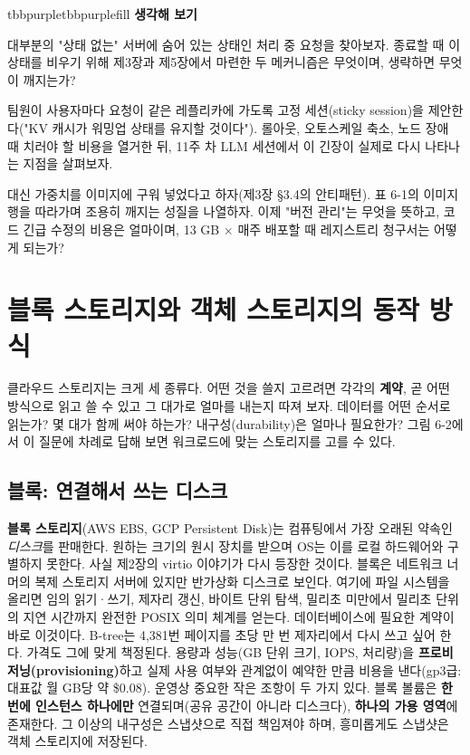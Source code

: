 \begin{calloutbox}{tbbpurple}{tbbpurplefill}
{\normalsize\bfseries\color{tbbpurple}생각해 보기}\par\vspace{3pt}
\begin{tbbitemize}
  \item 대부분의 "상태 없는" 서버에 숨어 있는 상태인 처리 중 요청을 찾아보자. 종료할 때 이 상태를 비우기 위해 제3장과 제5장에서 마련한 두 메커니즘은 무엇이며, 생략하면 무엇이 깨지는가?
  \item 팀원이 사용자마다 요청이 같은 레플리카에 가도록 고정 세션(sticky session)을 제안한다("KV 캐시가 워밍업 상태를 유지할 것이다"). 롤아웃, 오토스케일 축소, 노드 장애 때 치러야 할 비용을 열거한 뒤, 11주 차 LLM 세션에서 이 긴장이 실제로 다시 나타나는 지점을 살펴보자.
  \item 대신 가중치를 이미지에 구워 넣었다고 하자(제3장 §3.4의 안티패턴). 표 6-1의 이미지 행을 따라가며 조용히 깨지는 성질을 나열하자. 이제 "버전 관리"는 무엇을 뜻하고, 코드 긴급 수정의 비용은 얼마이며, 13 GB × 매주 배포할 때 레지스트리 청구서는 어떻게 되는가?
\end{tbbitemize}
\end{calloutbox}

\section{블록 스토리지와 객체 스토리지의 동작 방식}

클라우드 스토리지는 크게 세 종류다. 어떤 것을 쓸지 고르려면 각각의 \textbf{계약}, 곧 어떤 방식으로 읽고 쓸 수 있고 그 대가로 얼마를 내는지 따져 보자. 데이터를 어떤 순서로 읽는가? 몇 대가 함께 써야 하는가? 내구성(durability)은 얼마나 필요한가? 그림 6-2에서 이 질문에 차례로 답해 보면 워크로드에 맞는 스토리지를 고를 수 있다.

\subsection*{블록: 연결해서 쓰는 디스크}

\textbf{블록 스토리지}(AWS EBS, GCP Persistent Disk)는 컴퓨팅에서 가장 오래된 약속인 \textit{디스크}를 판매한다. 원하는 크기의 원시 장치를 받으며 OS는 이를 로컬 하드웨어와 구별하지 못한다. 사실 제2장의 virtio 이야기가 다시 등장한 것이다. 블록은 네트워크 너머의 복제 스토리지 서버에 있지만 반가상화 디스크로 보인다. 여기에 파일 시스템을 올리면 임의 읽기·쓰기, 제자리 갱신, 바이트 단위 탐색, 밀리초 미만에서 밀리초 단위의 지연 시간까지 완전한 POSIX 의미 체계를 얻는다. 데이터베이스에 필요한 계약이 바로 이것이다. B-tree는 4,381번 페이지를 초당 만 번 제자리에서 다시 쓰고 싶어 한다. 가격도 그에 맞게 책정된다. 용량과 성능(GB 단위 크기, IOPS, 처리량)을 \textbf{프로비저닝(provisioning)}하고 실제 사용 여부와 관계없이 예약한 만큼 비용을 낸다(gp3급: 대표값 월 GB당 약 \$0.08). 운영상 중요한 작은 조항이 두 가지 있다. 블록 볼륨은 \textbf{한 번에 인스턴스 하나에만} 연결되며(공유 공간이 아니라 디스크다), \textbf{하나의 가용 영역}에 존재한다. 그 이상의 내구성은 스냅샷으로 직접 책임져야 하며, 흥미롭게도 스냅샷은 객체 스토리지에 저장된다.

